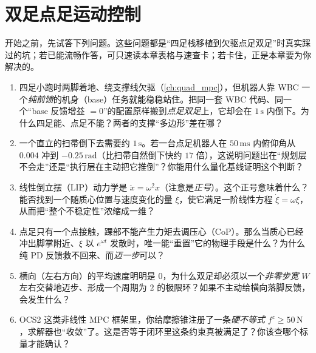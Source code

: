 \chapter{双足点足运动控制}
\label{ch:legged-biped}


\begin{practice}[前置自测]
开始之前，先试答下列问题。这些问题都是“四足栈移植到欠驱点足双足”时真实踩过的坑；若已能流畅作答，可只速读本章表格与速查卡；若卡住，正是本章要为你解决的。
\begin{enumerate}
  \item 四足小跑时两脚着地、绕支撑线欠驱（\cref{ch:quad_mpc}），但机器人靠 WBC 一个\emph{纯前馈}的机身（base）任务就能稳稳站住。把同一套 WBC 代码、同一个“base 反馈增益 $=0$”的配置原样搬到\emph{点足双足}上，它却会在 $1\,\mathrm{s}$ 内倒下。为什么四足能、点足不能？两者的支撑“多边形”差在哪？
  \item 一个直立的扫帚倒下去需要约 $1\,\mathrm{s}$。若一台点足机器人在 $50\,\mathrm{ms}$ 内俯仰角从 $0.004$ 冲到 $-0.25\,\mathrm{rad}$（比扫帚自然倒下快约 $17$ 倍），这说明问题出在“规划层不会走”还是“执行层在主动把它推倒”？你能用什么量化基线证明这个判断？
  \item 线性倒立摆（LIP）动力学是 $\ddot{x}=\omega^2 x$（注意是\emph{正号}）。这个正号意味着什么？能否找到一个随质心位置与速度变化的量 $\xi$，使它满足一阶线性方程 $\dot\xi=\omega\xi$，从而把“整个不稳定性”浓缩成一维？
  \item 点足只有一个点接触，踝部不能产生力矩去调压心（CoP）。那么当质心已经冲出脚掌附近、$\xi$ 以 $e^{\omega t}$ 发散时，唯一能“重置”它的物理手段是什么？为什么纯 PD 反馈救不回来、而\emph{迈一步}可以？
  \item 横向（左右方向）的平均速度明明是 $0$，为什么双足却必须以一个\emph{非零步宽} $W$ 左右交替地迈步、形成一个周期为 $2$ 的极限环？如果不主动给横向落脚反馈，会发生什么？
  \item OCS2 这类非线性 MPC 框架里，你给摩擦锥注册了一条\emph{硬不等式} $f^z\ge 50\,\mathrm{N}$，求解器也“收敛”了。这是否等于闭环里这条约束真被满足了？你该查哪个标量才能确认？
\end{enumerate}
\end{practice}

